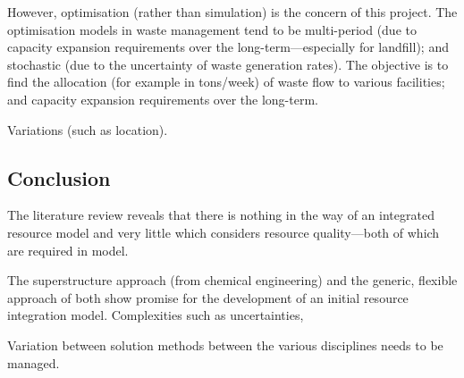 However, optimisation (rather than simulation) is the concern of this project. The optimisation models in waste management tend to be multi-period (due to capacity expansion requirements over the long-term---especially for landfill); and stochastic (due to the uncertainty of waste generation rates). The objective is to find the allocation (for example in tons/week) of waste flow to various facilities; and capacity expansion requirements over the long-term.

Variations (such as location).



\subsection{Conclusion}
The literature review reveals that there is nothing in the way of an integrated resource model and very little which considers resource quality---both of which are required in model.

The superstructure approach (from chemical engineering) and the generic, flexible approach of \citet{Samsatli} both show promise for the development of an initial resource integration model. Complexities such as uncertainties, 

Variation between solution methods between the various disciplines needs to be managed.

